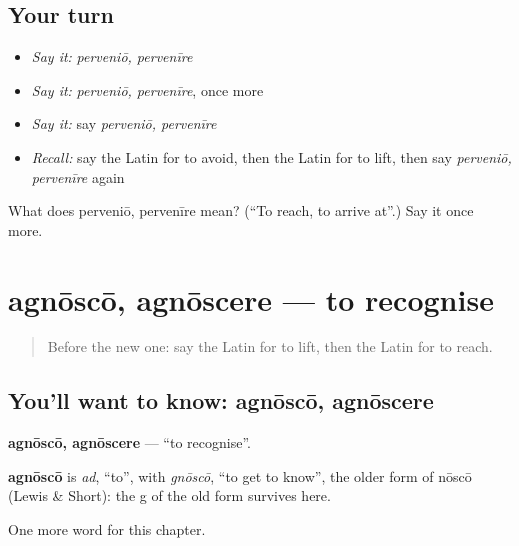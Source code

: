 \subsection*{Your turn}
\begin{itemize}
\raggedright
  \item \emph{Say it:} \emph{perveniō, pervenīre}
  \item \emph{Say it:} \emph{perveniō, pervenīre}, once more
  \item \emph{Say it:} say \emph{perveniō, pervenīre}
  \item \emph{Recall:} say the Latin for to avoid, then the Latin for to lift, then say \emph{perveniō, pervenīre} again
\end{itemize}

\begin{tcolorbox}[breakable,colback=teal!4,colframe=teal!35!black,title={Before you move on}]
What does perveniō, pervenīre mean? (\textquotedblleft{}To reach, to arrive at\textquotedblright{}.) Say it once more.
\end{tcolorbox}
\section[agnōscō, agnōscere]{agnōscō, agnōscere — to recognise}

\label{lesson:LA-C200-agnosco}



\begin{quote}
Before the new one: say the Latin for to lift, then the Latin for to reach.
\end{quote}

\subsection*{You'll want to know: agnōscō, agnōscere}
\textbf{agnōscō, agnōscere} — \textquotedblleft{}to recognise\textquotedblright{}.

\begin{cousinweb}
\textbf{agnōscō} is \emph{ad}, \textquotedblleft{}to\textquotedblright{}, with \emph{gnōscō}, \textquotedblleft{}to get to know\textquotedblright{}, the older form of nōscō (Lewis \& Short): the g of the old form survives here.
\end{cousinweb}

\begin{grammarlens}[title={What you've built}]
One more word for this chapter.
\end{grammarlens}

